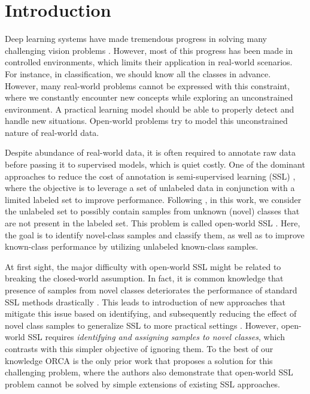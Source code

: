 \documentclass[runningheads]{eccv2022submission}
\begin{document}
\section{Introduction}


Deep learning systems have made tremendous progress in solving many challenging vision problems \cite{he2016deep,he2017mask,chen2018encoder,girshick2015fast,Qi_2017_CVPR,Anderson_2018_CVPR}. However, most of this progress has been made in controlled environments, which limits their application in real-world scenarios. 
For instance, in classification, we should know all the classes in advance. However, many real-world problems cannot be expressed with this constraint, where we constantly encounter new concepts while exploring an unconstrained environment. A practical learning model should be able to properly detect and handle new situations. Open-world problems \cite{scheirer2012toward,bendale2015towards,kardan2016fitted,han2019learning,cao2022openworld,joseph2021towards,kardan2017mitigating} try to model this unconstrained nature of real-world data. 

Despite abundance of real-world data, it is often required to annotate raw data before passing it to supervised models, which is quiet costly. One of the dominant approaches to reduce the cost of annotation is semi-supervised learning (SSL) \cite{NIPS2017_6719_meanT,NIPS2019_8749_MixMatch,Lee2013PseudoLabelT,miyato2018virtual,sohn2020fixmatch}, where the objective is to leverage a set of unlabeled data in conjunction with a limited labeled set to improve performance. Following \cite{cao2022openworld}, in this work, we consider the unlabeled set to possibly contain samples from unknown (novel) classes that are not present in the labeled set. This problem is called open-world SSL \cite{cao2022openworld}. Here, the goal is to identify novel-class samples and classify them, as well as to improve known-class performance by utilizing unlabeled known-class samples.  


At first sight, the major difficulty with open-world SSL might be related to breaking the closed-world assumption. In fact, it is common knowledge that presence of samples from novel classes deteriorates the performance of standard SSL methods drastically \cite{oliver2018realistic,chen2020semi}. This leads to introduction of new approaches that mitigate this issue based on identifying, and subsequently reducing the effect of novel class samples to generalize SSL to more practical settings \cite{guo2020safe,chen2020semi,zhao2020robust}. However, open-world SSL requires \emph{identifying and assigning samples to novel classes}, which contrasts with this simpler objective of ignoring them. To the best of our knowledge ORCA \cite{cao2022openworld} is the only prior work that proposes a solution for this challenging problem, where
the authors also demonstrate that open-world SSL problem cannot be solved by simple extensions of existing SSL approaches.
\end{document}
